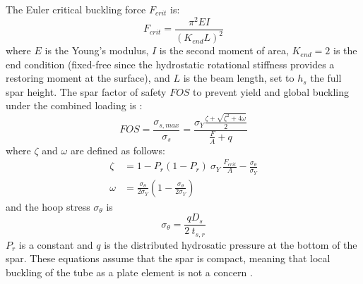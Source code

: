 The Euler critical buckling force $F_{crit}$ is:
\begin{equation}
    F_{crit} = \frac{\pi^2 E I}{(K_{end} L)^2}
\end{equation}
where $E$ is the Young's modulus, $I$ is the second moment of area, $K_{end}=2$ is the end condition (fixed-free since the hydrostatic rotational stiffness provides a restoring moment at the surface), and $L$ is the beam length, set to $h_s$ the full spar height.
The spar factor of safety $FOS$ to prevent yield and global buckling under the combined loading is \cite{american_bureau_of_shipping_requirements_2022}:
\begin{equation}
    FOS = \frac{\sigma_{s,max}}{\sigma_s} = \frac{\sigma_Y \frac{\zeta + \sqrt{\zeta^2+4\omega}}{2}}{\frac{F}{A} + q}
\end{equation}
where $\zeta$ and $\omega$ are defined as follows:
\begin{equation}
\begin{aligned}
     \zeta &= 1 - P_r(1 - P_r)~\sigma_Y~\frac{F_{crit}}{A} - \frac{\sigma_\theta}{\sigma_Y} \\
    \omega &= \frac{\sigma_\theta}{2\sigma_Y}  (1 - \frac{\sigma_\theta}{2\sigma_Y})
\end{aligned}
\end{equation}
and the hoop stress $\sigma_\theta$ is 
\begin{equation}
     \sigma_\theta = \frac{qD_s}{2~t_{s,r}}
\end{equation}
$P_r$ is a constant and $q$ is the distributed hydrosatic pressure at the bottom of the spar.
These equations assume that the spar is compact, meaning that local buckling of the tube as a plate element is not a concern \cite{american_bureau_of_shipping_requirements_2022}.

\clearpage
